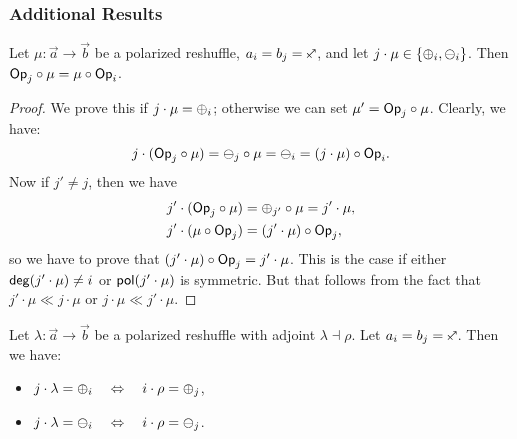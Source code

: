 \documentclass[a4paper]{memoir}
\begin{document}
\subsubsection{Additional Results}
\begin{proposition} \label{thm:poresh-op}
	Let $\mu : \vec a \to \vec b$ be a polarized reshuffle, $a_i = b_j = \ypolar$, and let $j \cdot \mu \in \mathopen{}\left\{ {\oplus}_i, {\ominus}_i \right\}\mathclose{}$.
	Then ${\mathsf{Op}}_j \circ \mu = \mu \circ {\mathsf{Op}}_i$.
\end{proposition}
\begin{proof}
	We prove this if $j \cdot \mu = {\oplus}_i$; otherwise we can set $\mu' = {\mathsf{Op}}_j \circ \mu$. Clearly, we have:
	\[
		j \cdot ({\mathsf{Op}}_j \circ \mu) = {\ominus}_j \circ \mu = {\ominus}_i = (j \cdot \mu) \circ {\mathsf{Op}}_i.
	\]
	Now if $j' \neq j$, then we have
	\begin{align*}
		j' \cdot ({\mathsf{Op}}_j \circ \mu) &= {\oplus}_{j'} \circ \mu = j' \cdot \mu, \\
		j' \cdot (\mu \circ {\mathsf{Op}}_j) &= (j' \cdot \mu) \circ {\mathsf{Op}}_j,
	\end{align*}
	so we have to prove that $(j' \cdot \mu) \circ {\mathsf{Op}}_j = j' \cdot \mu$.
	This is the case if either $\mathsf{deg}(j' \cdot \mu) \neq i$ or $\mathsf{pol}(j' \cdot \mu)$ is symmetric. But that follows from the fact that $j' \cdot \mu \ll j \cdot \mu$ or $j \cdot \mu \ll j' \cdot \mu$.
\end{proof}
\begin{proposition} \label{thm:poresh-adjoint-directed}
	Let $\lambda : \vec a \to \vec b$ be a polarized reshuffle with adjoint $\lambda \dashv \rho$. Let $a_i = b_j = \ypolar$. Then we have:
	\begin{itemize}
		\item $j \cdot \lambda = {\oplus}_i \quad\Leftrightarrow\quad i \cdot \rho = {\oplus}_j$,
		\item $j \cdot \lambda = {\ominus}_i \quad\Leftrightarrow\quad i \cdot \rho = {\ominus}_j$.
	\end{itemize}
\end{proposition}
\end{document}
